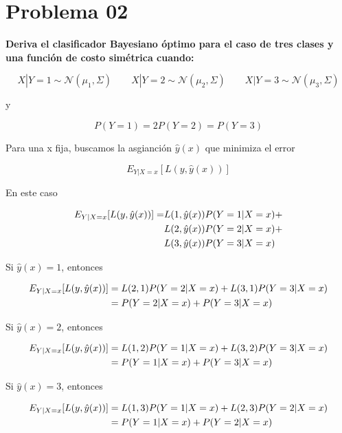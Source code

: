 
\section*{Problema 02}

\textbf{Deriva el clasificador Bayesiano óptimo para el caso de tres clases y una función de costo simétrica cuando:}

\begin{equation*}
    X|Y=1 \sim \mathcal{N}(\mu_1,\Sigma)\qquad X|Y=2 \sim \mathcal{N}(\mu_2,\Sigma)\qquad X|Y=3 \sim \mathcal{N}(\mu_3,\Sigma)
\end{equation*}

y

\begin{equation*}
    P(Y=1)=2P(Y=2)=P(Y=3)
\end{equation*}

Para una x fija, buscamos la asgianción $\hat{y}(x)$ que minimiza el error

\begin{equation*}
    E_{Y|X=x} [L(y,\hat{y}(x))]
\end{equation*}

En este caso

\begin{align*}
    E_{Y|X=x} [L(y,\hat{y}(x))] = & L(1,\hat{y}(x))P(Y=1|X=x) + \\
                                  & L(2,\hat{y}(x))P(Y=2|X=x) + \\
                                  & L(3,\hat{y}(x))P(Y=3|X=x)
\end{align*}

Si $\hat{y}(x)=1$, entonces

\begin{align*}
    E_{Y|X=x} [L(y,\hat{y}(x))] & =  L(2 ,1)P(Y=2|X=x) + L(3,1)P(Y=3|X=x) \\
                                & = P(Y=2|X=x) + P(Y=3|X=x)
\end{align*}

Si $\hat{y}(x)=2$, entonces

\begin{align*}
    E_{Y|X=x} [L(y,\hat{y}(x))] & =  L(1 ,2)P(Y=1|X=x) + L(3,2)P(Y=3|X=x) \\
                                & = P(Y=1|X=x) + P(Y=3|X=x)
\end{align*}

Si $\hat{y}(x)=3$, entonces

\begin{align*}
    E_{Y|X=x} [L(y,\hat{y}(x))] & =  L(1 ,3)P(Y=1|X=x) + L(2,3)P(Y=2|X=x) \\
                                & = P(Y=1|X=x) + P(Y=2|X=x)
\end{align*}

